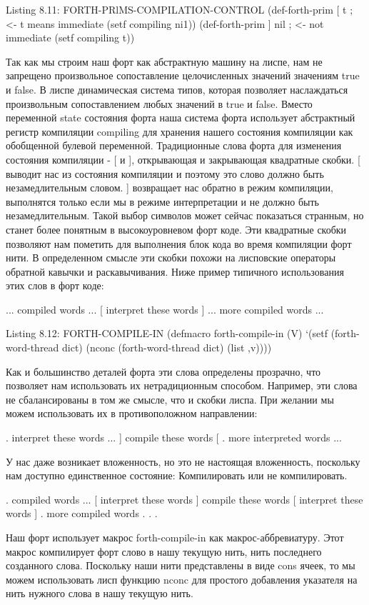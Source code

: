 Listing 8.11: FORTH-PRlMS-COMPILATION-CONTROL
(def-forth-prim [ t ; <- t means immediate
(setf compiling ni1))
(def-forth-prim ] nil ; <- not immediate
(setf compiling t))

Так как мы строим наш форт как абстрактную машину на лиспе, нам не запрещено произвольное сопоставление целочисленных значений значениям true и false. В лиспе динамическая система типов, которая позволяет наслаждаться произвольным сопоставлением любых значений в true и false. Вместо переменной state состояния форта наша система форта использует абстрактный регистр компиляции compiling для хранения нашего состояния компиляции как обобщенной булевой переменной. Традиционные слова форта для изменения состояния компиляции - [ и ], открывающая и закрывающая квадратные скобки. [ выводит нас из состояния компиляции и поэтому это слово должно быть незамедлительным словом. ] возвращает нас обратно в режим компиляции, выполнятся только если мы в режиме интерпретации и не должно быть незамедлительным. Такой выбор символов может сейчас показаться странным, но станет более понятным в высокоуровневом форт коде. Эти квадратные скобки позволяют нам пометить для выполнения блок кода во время компиляции форт нити. В определенном смысле эти скобки похожи на лисповские операторы обратной кавычки и раскавычивания. Ниже пример типичного использования этих слов в форт коде:

... compiled words ...
[ interpret these words ]
... more compiled words ...

Listing 8.12: FORTH-COMPILE-IN
(defmacro forth-compile-in (V)
‘(setf (forth-word-thread dict)
(nconc (forth-word-thread dict)
(list ,v))))

Как и большинство деталей форта эти слова определены прозрачно, что позволяет нам использовать их нетрадиционным способом. Например, эти слова не сбалансированы в том же смысле, что и скобки лиспа. При желании мы можем использовать их в противоположном направлении:

. interpret these words ...
] compile these words [
. more interpreted words ...

У нас даже возникает вложенность, но это не настоящая вложенность, поскольку нам доступно единственное состояние: Компилировать или не компилировать.

. compiled words ...
[ interpret these words
] compile these words [
interpret these words
]
. more compiled words . . .

Наш форт использует макрос forth-compile-in как макрос-аббревиатуру. Этот макрос компилирует форт слово в нашу текущую нить, нить последнего созданного слова. Поскольку наши нити представлены в виде cons ячеек, то мы можем использовать лисп функцию nconc для простого добавления указателя на нить нужного слова в нашу текущую нить.

